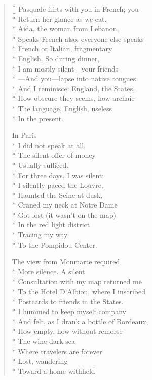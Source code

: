 \label{ch:venezia_mestre}
\settowidth{\versewidth}{As the vaporetto scuds across sequined canals.}
\begin{verse}[\versewidth]
Pasquale flirts with you in French; you\\*
Return her glance as we eat.\\*
Aida, the woman from Lebanon,\\*
Speaks French also; everyone else speaks\\*
French or Italian, fragmentary\\*
English.  So during dinner,\\*
I am mostly silent---your friends\\*
---And you---lapse into native tongues\\*
And I reminisce: England, the States,\\*
How obscure they seems, how archaic\\*
The language, English, useless\\*
In the present.

\hspace*{3\vgap} In Paris\\*
I did not speak at all.\\*
The silent offer of money\\*
Usually sufficed.\\*
For three days, I was silent:\\*
I silently paced the Louvre,\\*
Haunted the Seine at dusk,\\*
Craned my neck at Notre Dame\\*
Got lost (it wasn't on the map)\\*
In the red light district\\*
Tracing my way\\*
To the Pompidou Center.

The view from Monmarte required\\*
More silence.   A silent\\*
Consultation with my map returned me\\*
To the Hotel D'Albion, where I inscribed\\*
Postcards to friends in the States.\\*
I hummed to keep myself company\\*
And felt, as I drank a bottle of Bordeaux,\\*
How empty, how without remorse\\*
The wine-dark sea\\*
Where travelers are forever\\*
Lost, wandering\\*
Toward a home withheld


\end{verse}
